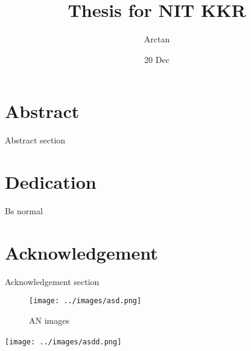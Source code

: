 \documentclass{report}
\title{Thesis for \Large{NIT KKR}}
\author{Arctan}
\date{20 Dec}
\begin{document}
\maketitle    

\chapter*{Abstract}
Abstract section

\chapter*{Dedication}
Bs normal 


\chapter*{Acknowledgement}
Acknowledgement section

\tableofcontents

\begin{figure}[h]
    \centering
    \texttt{[image: ../images/asd.png]}
    \caption{AN images}
    \label{fig:img1}
\end{figure}



\begin{figure*}
    \centering
    \texttt{[image: ../images/asdd.png]}
    \
\end{figure*}


\appendix

\end{document}
